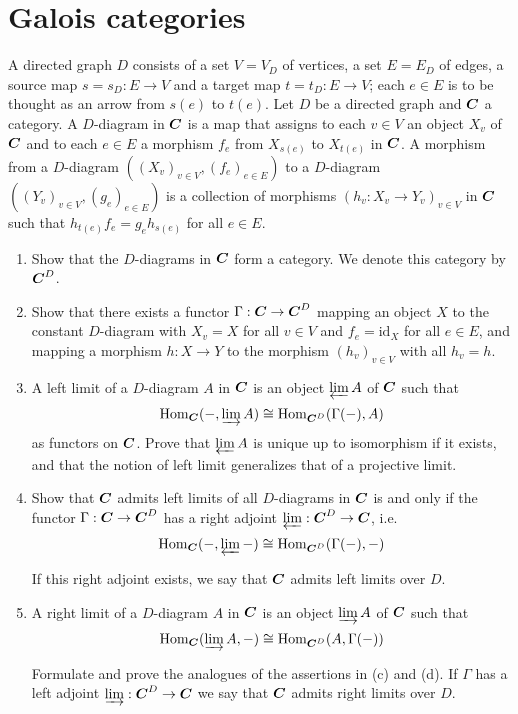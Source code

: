 \section{Galois categories}

\begin{ex}
	A directed graph $D$ consists of a set $V = V_D$ of vertices, a set $E = E_D$ of edges, a source map $s = s_D : E \to V$ and a target map $t = t_D: E \to V$; each $e \in E$ is to be thought as an arrow from $s(e)$ to $t(e)$. Let $D$ be a directed graph and $\boldsymbol{C}$ a category. A $D$-diagram in $\boldsymbol{C}$ is a map that assigns to each $v \in V$ an object $X_v$ of $\boldsymbol{C}$ and to each $e \in E$ a morphism $f_e$ from $X_{s(e)}$ to $X_{t(e)}$ in $\boldsymbol{C}$. A morphism from a $D$-diagram $((X_v)_{v \in V}, (f_e)_{e \in E})$ to a $D$-diagram $((Y_v)_{v \in V}, (g_e)_{e \in E})$ is a collection of morphisms $(h_v: X_v \to Y_v)_{v \in V}$ in $\boldsymbol{C}$ such that $h_{t(e)}f_e = g_e h_{s(e)}$ for all $e \in E$.
	\begin{enumerate}[label=\alph*)]
		\item Show that the $D$-diagrams in $\boldsymbol{C}$ form a category. We denote this category by $\boldsymbol{C}^D$.

		\item Show that there exists a functor $\Gamma: \boldsymbol{C} \to \boldsymbol{C}^D$ mapping an object $X$ to the constant $D$-diagram with $X_v = X$ for all $v \in V$ and $f_e = \text{id}_X$ for all $e \in E$, and mapping a morphism $h: X \to Y$ to the morphism $(h_v)_{v \in V}$ with all $h_v = h$.

		\item A left limit of a $D$-diagram $A$ in $\boldsymbol{C}$ is an object $\varprojlim A$ of $\boldsymbol{C}$ such that
		\[
			\mathrm{Hom}_{\boldsymbol{C}}(-, \varinjlim A) \cong \mathrm{Hom}_{\boldsymbol{C}^D}(\Gamma(-), A)
		\]
		as functors on $\boldsymbol{C}$. Prove that $\varprojlim A$ is unique up to isomorphism if it exists, and that the notion of left limit generalizes that of a projective limit.

		\item Show that $\boldsymbol{C}$ admits left limits of all $D$-diagrams in $\boldsymbol{C}$ is and only if the functor $\Gamma: \boldsymbol{C} \to \boldsymbol{C}^D$ has a right adjoint $\varprojlim: \boldsymbol{C}^D \to \boldsymbol{C}$, i.e.
		\[
			\mathrm{Hom}_{\boldsymbol{C}}(-, \varprojlim -) \cong \mathrm{Hom}_{\boldsymbol{C}^D}(\Gamma(-),-)
		\]

		If this right adjoint exists, we say that $\boldsymbol{C}$ admits left limits over $D$.

		\item A right limit of a $D$-diagram $A$ in $\boldsymbol{C}$ is an object $\varinjlim A$ of $\boldsymbol{C}$ such that 
		\[
			\mathrm{Hom}_{\boldsymbol{C}} (\varinjlim A, -) \cong \mathrm{Hom}_{\boldsymbol{C}^D}(A, \Gamma(-))
		\]

		Formulate and prove the analogues of the assertions in (c) and (d). If $\Gamma$ has a left adjoint $\varinjlim: \boldsymbol{C}^D \to \boldsymbol{C}$ we say that $\boldsymbol{C}$ admits right limits over $D$.
	\end{enumerate}
\end{ex}

